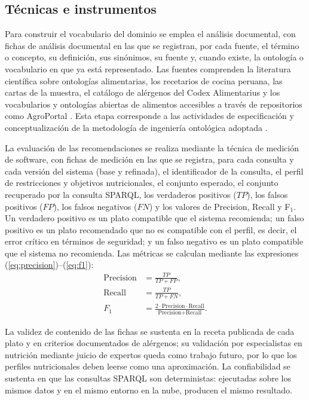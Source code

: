 \documentclass[conference]{IEEEtran}
\begin{document}
\subsection{Técnicas e instrumentos}
Para construir el vocabulario del dominio se emplea el análisis documental, con fichas de análisis documental en las que se registran, por cada fuente, el término o concepto, su definición, sus sinónimos, su fuente y, cuando existe, la ontología o vocabulario en que ya está representado. Las fuentes comprenden la literatura científica sobre ontologías alimentarias, los recetarios de cocina peruana, las cartas de la muestra, el catálogo de alérgenos del Codex Alimentarius y los vocabularios y ontologías abiertas de alimentos accesibles a través de repositorios como AgroPortal \cite{jonquet2018}. Esta etapa corresponde a las actividades de especificación y conceptualización de la metodología de ingeniería ontológica adoptada \cite{gomezperez2004}.

La evaluación de las recomendaciones se realiza mediante la técnica de medición de software, con fichas de medición en las que se registra, para cada consulta y cada versión del sistema (base y refinada), el identificador de la consulta, el perfil de restricciones y objetivos nutricionales, el conjunto esperado, el conjunto recuperado por la consulta SPARQL, los verdaderos positivos ($TP$), los falsos positivos ($FP$), los falsos negativos ($FN$) y los valores de Precision, Recall y F$_1$. Un verdadero positivo es un plato compatible que el sistema recomienda; un falso positivo es un plato recomendado que no es compatible con el perfil, es decir, el error crítico en términos de seguridad; y un falso negativo es un plato compatible que el sistema no recomienda. Las métricas se calculan mediante las expresiones (\ref{eq:precision})--(\ref{eq:f1}):
\begin{align}
\text{Precision} &= \frac{TP}{TP+FP}, \label{eq:precision}\\
\text{Recall} &= \frac{TP}{TP+FN}, \label{eq:recall}\\
F_1 &= \frac{2\cdot\text{Precision}\cdot\text{Recall}}{\text{Precision}+\text{Recall}}. \label{eq:f1}
\end{align}

La validez de contenido de las fichas se sustenta en la receta publicada de cada plato y en criterios documentados de alérgenos; su validación por especialistas en nutrición mediante juicio de expertos queda como trabajo futuro, por lo que los perfiles nutricionales deben leerse como una aproximación. La confiabilidad se sustenta en que las consultas SPARQL son deterministas: ejecutadas sobre los mismos datos y en el mismo entorno en la nube, producen el mismo resultado.
\end{document}
